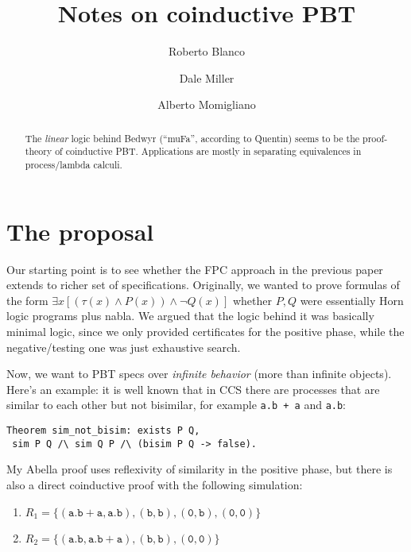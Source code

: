 \documentclass[sigconf]{acmart}
\begin{document}


\title{Notes on coinductive PBT}
\author{Roberto Blanco}
\author{Dale Miller}
\author{Alberto Momigliano}

\begin{abstract}
  The \emph{linear } logic behind Bedwyr (``muFa'', according to
  Quentin) seems to be the proof-theory of coinductive PBT. Applications are mostly in separating
  equivalences in process/lambda calculi.
\end{abstract}
\maketitle

\section{The proposal}
\label{sec:p}



Our starting point is to see whether the FPC approach in the previous
paper extends to richer set of specifications. Originally, we wanted
to prove formulas of the form
%
\(\exists x [(\tau(x)\land P(x)) \land \neg Q(x)]\)
%
whether $P,Q$ were essentially Horn logic programs plus nabla. We
argued that the logic behind it was basically minimal logic, since we
only provided certificates for the positive phase, while the
negative/testing one was just exhaustive search.

Now, we want to PBT specs over \emph{infinite behavior} (more than infinite
objects). Here's an example: it is well known that in CCS there are processes that are similar to each other but not bisimilar,
for example \texttt{a.b + a} and \texttt{a.b}:

\begin{lstlisting}
Theorem sim_not_bisim: exists P Q,
 sim P Q /\ sim Q P /\ (bisim P Q -> false).
\end{lstlisting}
My Abella proof uses reflexivity of similarity in the positive phase,
but there is also a direct coinductive proof with the following
simulation:
\begin{enumerate}
\item $R_1 = \{\mathtt{(a.b+a, a.b ),(b,b),(0,b),(0,0)}\}$
  \item $R_2 = \{\mathtt{(a.b,a.b+a),(b,b), (0,0)}\}$ 
\end{enumerate}
%
\end{document}
